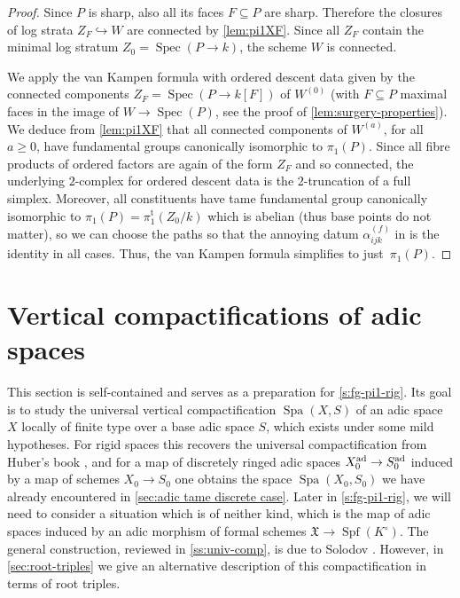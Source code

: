 \documentclass[a4paper,twoside,11pt,reqno]{amsart}
\newcommand{\fX}{{\mathfrak{X}}}
\newcommand{\inj}{\hookrightarrow}
\DeclareMathOperator{\Spec}{Spec}
\DeclareMathOperator{\Spf}{Spf}
\DeclareMathOperator{\Spa}{Spa}
\newcommand{\pitame}{\pi_1^{\mathrm{t}}}
\theoremstyle{definition}
\numberwithin{equation}{subsection}
\begin{document}
\begin{proof}
Since $P$ is sharp, also all its faces $F \subseteq P$ are sharp. Therefore the closures of log strata $Z_F \inj W$ are connected by \cref{lem:pi1XF}. Since all $Z_F$ contain the minimal log stratum $Z_0 = \Spec(P \to k)$, the scheme $W$ is connected. 

We apply the van Kampen formula with ordered descent data given by the  connected components $Z_F = \Spec(P \to k[F])$ of $W^{(0)}$ (with $F \subseteq P$ maximal faces in the image of $W \to \Spec(P)$, see the proof of \cref{lem:surgery-properties}). We deduce from \cref{lem:pi1XF} that all connected components of $W^{(a)}$, for all $a\geq 0$, have fundamental groups canonically isomorphic to $\pi_1(P)$.  Since all fibre products of ordered factors are again of the form $Z_F$ and so connected, the underlying $2$-complex for ordered descent data is the $2$-truncation of a full simplex. Moreover, all constituents have tame fundamental group canonically isomorphic to $\pi_1(P) = \pitame(Z_0/k)$ which is abelian (thus base points do not matter), so we can choose the paths so that the annoying datum $\alpha_{ijk}^{(f)}$ in \cite[Corollary~5.3]{Stix2006:vanKampen} is the identity in all cases. Thus, the van Kampen formula simplifies to just~$\pi_1(P)$.
\end{proof}


\section{Vertical compactifications of adic spaces}
\label{s:compactifications}

This section is self-contained and serves as a preparation for \cref{s:fg-pi1-rig}.
Its goal is to study the universal vertical compactification $\Spa(X,S)$ of an adic space $X$ locally of finite type over a base adic space $S$, which exists under some mild hypotheses.
For rigid spaces this recovers the universal compactification from Huber's book \cite[\S 5.1]{HuberBook}, and for a map of discretely ringed adic spaces $X_0^{\rm ad}\to S_0^{\rm ad}$ induced by a map of schemes $X_0\to S_0$ one obtains the space $\Spa(X_0, S_0)$ we have already encountered in \cref{sec:adic tame discrete case}. Later in \cref{s:fg-pi1-rig}, we will need to consider a situation which is of neither kind, which is the map of adic spaces induced by an adic morphism of formal schemes $\fX\to\Spf(K^\circ)$.   The general construction, reviewed in \cref{ss:univ-comp}, is due to Solodov \cite{Solodov-vertical-compactification}.
However, in \cref{sec:root-triples} we give an alternative description of this compactification in terms of root triples. 
\end{document}
